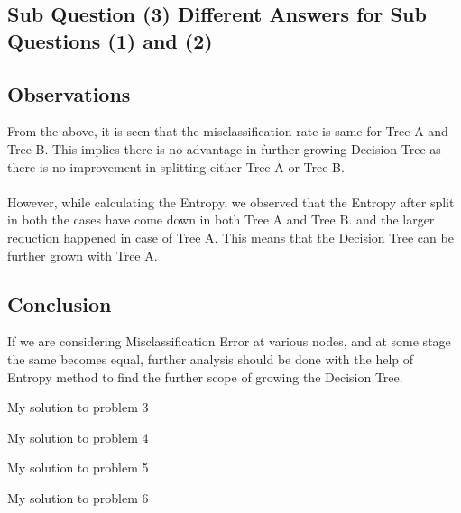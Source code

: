 \documentclass[a4paper,11pt]{article}
\newcommand\tab[1][1cm]{\hspace*{#1}}
\begin{document}
\begin{mlsolution}
\section{Sub Question (3) Different Answers for Sub Questions (1) and (2)}
\subsection{Observations}
\tab From the above, it is seen that the misclassification rate is same for Tree A and Tree B. This implies there is no advantage in further growing Decision Tree as there is no improvement in splitting either Tree A or Tree B.
\noindent\\
\\
\tab However, while calculating the Entropy, we observed that the Entropy after split in both the cases have come down in both Tree A and Tree B. and the larger reduction happened in case of Tree A. This means that the Decision Tree can be further grown with Tree A.
\subsection{Conclusion}
\tab If we are considering Misclassification Error at various nodes, and at some stage the same becomes equal, further analysis should be done with the help of Entropy method to find the further scope of growing the Decision Tree.

\end{mlsolution}

\begin{mlsolution}


\end{mlsolution}

\begin{mlsolution}

My solution to problem 3

\end{mlsolution}

\begin{mlsolution}

My solution to problem 4

\end{mlsolution}

\begin{mlsolution}

My solution to problem 5

\end{mlsolution}

\begin{mlsolution}

My solution to problem 6

\end{mlsolution}
\end{document}
